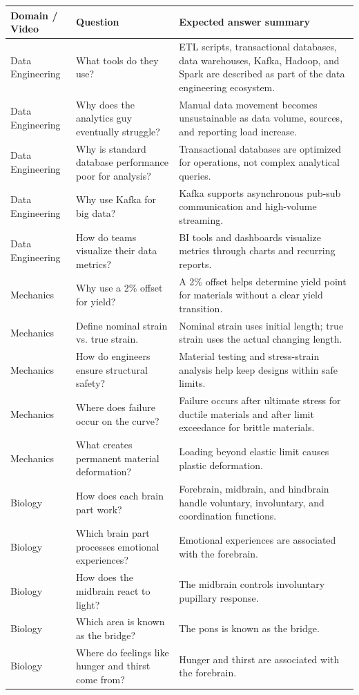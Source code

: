 \documentclass[12pt,a4paper,oneside]{report}
\begin{document}
\begin{longtable}{p{} p{} p{}}
\toprule
\textbf{Domain / Video} & \textbf{Question} & \textbf{Expected answer summary} \\
\midrule
Data Engineering & What tools do they use? & ETL scripts, transactional databases, data warehouses, Kafka, Hadoop, and Spark are described as part of the data engineering ecosystem. \\
Data Engineering & Why does the analytics guy eventually struggle? & Manual data movement becomes unsustainable as data volume, sources, and reporting load increase. \\
Data Engineering & Why is standard database performance poor for analysis? & Transactional databases are optimized for operations, not complex analytical queries. \\
Data Engineering & Why use Kafka for big data? & Kafka supports asynchronous pub-sub communication and high-volume streaming. \\
Data Engineering & How do teams visualize their data metrics? & BI tools and dashboards visualize metrics through charts and recurring reports. \\
Mechanics & Why use a 2\% offset for yield? & A 2\% offset helps determine yield point for materials without a clear yield transition. \\
Mechanics & Define nominal strain vs. true strain. & Nominal strain uses initial length; true strain uses the actual changing length. \\
Mechanics & How do engineers ensure structural safety? & Material testing and stress-strain analysis help keep designs within safe limits. \\
Mechanics & Where does failure occur on the curve? & Failure occurs after ultimate stress for ductile materials and after limit exceedance for brittle materials. \\
Mechanics & What creates permanent material deformation? & Loading beyond elastic limit causes plastic deformation. \\
Biology & How does each brain part work? & Forebrain, midbrain, and hindbrain handle voluntary, involuntary, and coordination functions. \\
Biology & Which brain part processes emotional experiences? & Emotional experiences are associated with the forebrain. \\
Biology & How does the midbrain react to light? & The midbrain controls involuntary pupillary response. \\
Biology & Which area is known as the bridge? & The pons is known as the bridge. \\
Biology & Where do feelings like hunger and thirst come from? & Hunger and thirst are associated with the forebrain. \\
\bottomrule
\end{longtable}
\end{document}
